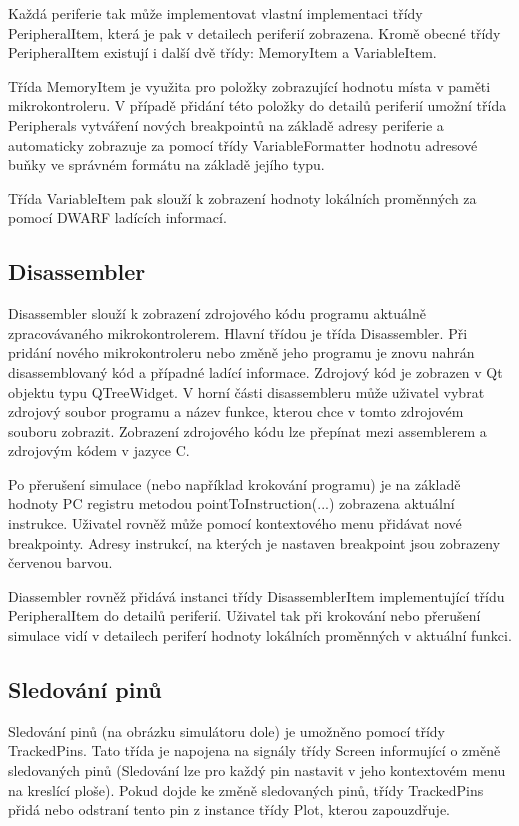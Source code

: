 Každá periferie tak může implementovat vlastní implementaci třídy PeripheralItem, která je pak v detailech periferií zobrazena. Kromě obecné třídy PeripheralItem existují i další dvě třídy: MemoryItem a VariableItem.

Třída MemoryItem je využita pro položky zobrazující hodnotu místa v paměti mikrokontroleru. V případě přidání této položky do detailů periferií umožní třída Peripherals vytváření nových breakpointů na základě adresy periferie a automaticky zobrazuje za pomocí třídy VariableFormatter hodnotu adresové buňky ve správném formátu na základě jejího typu.

Třída VariableItem pak slouží k zobrazení hodnoty lokálních proměnných za pomocí DWARF ladících informací.

\subsection{Disassembler}
\label{screen_disassembler}

Disassembler slouží k zobrazení zdrojového kódu programu aktuálně zpracovávaného mikrokontrolerem. Hlavní třídou je třída Disassembler. Při pridání nového mikrokontroleru nebo změně jeho programu je znovu nahrán disassemblovaný kód a případné ladící informace. Zdrojový kód je zobrazen v Qt objektu typu QTreeWidget. V horní části disassembleru může uživatel vybrat zdrojový soubor programu a název funkce, kterou chce v tomto zdrojovém souboru zobrazit. Zobrazení zdrojového kódu lze přepínat mezi assemblerem a zdrojovým kódem v jazyce C.

Po přerušení simulace (nebo například krokování programu) je na základě hodnoty PC registru metodou pointToInstruction(...) zobrazena aktuální instrukce. Uživatel rovněž může pomocí kontextového menu přidávat nové breakpointy. Adresy instrukcí, na kterých je nastaven breakpoint jsou zobrazeny červenou barvou.

Diassembler rovněž přidává instanci třídy DisassemblerItem implementující třídu PeripheralItem do detailů periferií. Uživatel tak při krokování nebo přerušení simulace vidí v detailech periferí hodnoty lokálních proměnných v aktuální funkci.

\subsection{Sledování pinů}
\label{screen_tracking}

Sledování pinů (na obrázku simulátoru dole) je umožněno pomocí třídy TrackedPins. Tato třída je napojena na signály třídy Screen informující o změně sledovaných pinů (Sledování lze pro každý pin nastavit v jeho kontextovém menu na kreslící ploše). Pokud dojde ke změně sledovaných pinů, třídy TrackedPins přidá nebo odstraní tento pin z instance třídy Plot, kterou zapouzdřuje.

